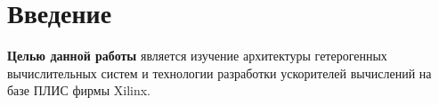 \chapter*{Введение}

\textbf{Целью данной работы} является изучение архитектуры гетерогенных вычислительных систем и технологии разработки ускорителей вычислений на базе ПЛИС фирмы Xilinx.

